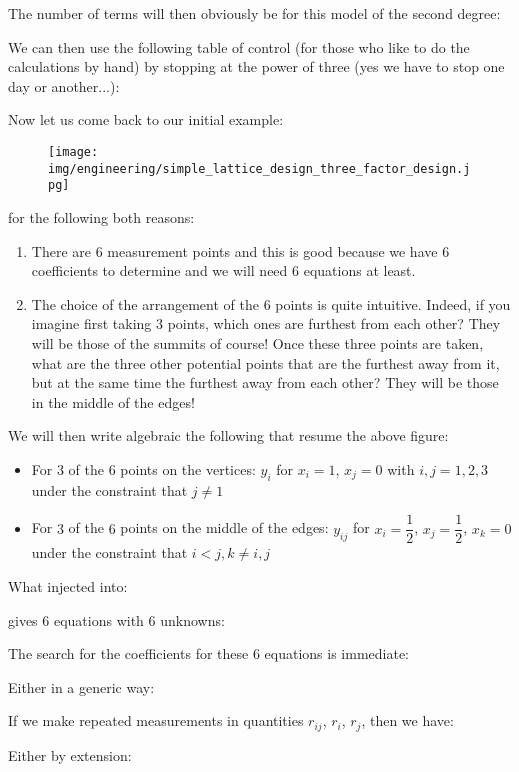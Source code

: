 	The number of terms will then obviously be for this model of the second degree:
	
 	We can then use the following table of control (for those who like to do the calculations by hand) by stopping at the power of three (yes we have to stop one day or another...):
	
	Now let us come back to our initial example:
	
	\begin{figure}[H]
		\centering
		\texttt{[image: img/engineering/simple\_lattice\_design\_three\_factor\_design.jpg]}
	\end{figure}
	for the following both reasons:
	\begin{enumerate}
		\item There are $6$ measurement points and this is good because we have $6$ coefficients to determine and we will need $6$ equations at least.

		\item The choice of the arrangement of the $6$ points is quite intuitive. Indeed, if you imagine first taking $3$ points, which ones are furthest from each other? They will be those of the summits of course! Once these three points are taken, what are the three other potential points that are the furthest away from it, but at the same time the furthest away from each other? They will be those in the middle of the edges!
	\end{enumerate}
	We will then write algebraic the following that resume the above figure:
	\begin{itemize}
		\item For $3$ of the $6$ points on the vertices: $y_i$ for $x_i=1$, $x_j=0$ with $i,j=1,2,3$ under the constraint that $j\neq 1$

		\item For $3$ of the $6$ points on the middle of the edges: $y_{ij}$ for $x_i=\dfrac{1}{2}$, $x_j=\dfrac{1}{2}$, $x_k=0$ under the constraint that $i<j,k\neq i,j$
	\end{itemize}
	What injected into:
	
	gives $6$ equations with $6$ unknowns:
	
	The search for the coefficients for these $6$ equations is immediate:
	
	Either in a generic way:
	
 	If we make repeated measurements in quantities $r_{ij}$, $r_i$, $r_j$, then we have:
	
 	Either by extension:
	
